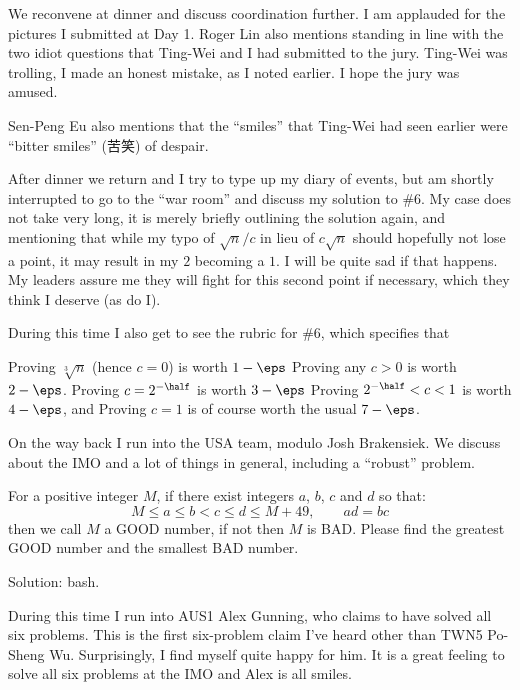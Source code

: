 \documentclass[11pt]{scrreprt}
\numberwithin{figure}{chapter}
\begin{document}
We reconvene at dinner and discuss coordination further.
I am applauded for the pictures I submitted at Day 1.
Roger Lin also mentions standing in line with the two idiot questions that Ting-Wei and I
had submitted to the jury. Ting-Wei was trolling, I made an honest mistake, as I noted earlier.
I hope the jury was amused.

Sen-Peng Eu also mentions that the ``smiles'' that Ting-Wei had seen earlier were ``bitter smiles'' (苦笑) of despair.

After dinner we return and I try to type up my diary of events, but am shortly interrupted to go to the ``war room''
and discuss my solution to \#6. My case does not take very long, it is merely briefly outlining the solution again,
and mentioning that while my typo of $\sqrt n / c$ in lieu of $c \sqrt n$ should hopefully not lose a point, it
may result in my $2$ becoming a $1$. I will be quite sad if that happens.
My leaders assure me they will fight for this second point if necessary, which they think I deserve (as do I).

During this time I also get to see the rubric for \#6, which specifies that
\begin{itemize}
  \ii Proving $\sqrt[3]{n}$ (hence $c=0$) is worth $1 - \eps$
  \ii Proving any $c > 0$ is worth $2 - \eps$.
  \ii Proving $c = 2^{-\half}$ is worth $3 - \eps$
  \ii Proving $2^{-\half} < c < 1$ is worth $4 - \eps$, and
  \ii Proving $c=1$ is of course worth the usual $7 - \eps$.
\end{itemize}

On the way back I run into the USA team, modulo Josh Brakensiek.
We discuss about the IMO and a lot of things in general, including a ``robust'' problem.
\begin{problem*}
  For a positive integer $M$, if there exist integers $a$, $b$, $c$ and $d$ so that:
  \[ M \leq a \leq b < c \leq d \leq M+49, \qquad ad=bc \]
  then we call $M$ a GOOD number, if not then $M$ is BAD. Please find the greatest GOOD number and the smallest BAD number.
\end{problem*}
Solution: bash.

During this time I run into AUS1 Alex Gunning, who claims to have solved all six problems.
This is the first six-problem claim I've heard other than TWN5 Po-Sheng Wu. Surprisingly, I find myself quite happy for him.
It is a great feeling to solve all six problems at the IMO and Alex is all smiles.
\end{document}
